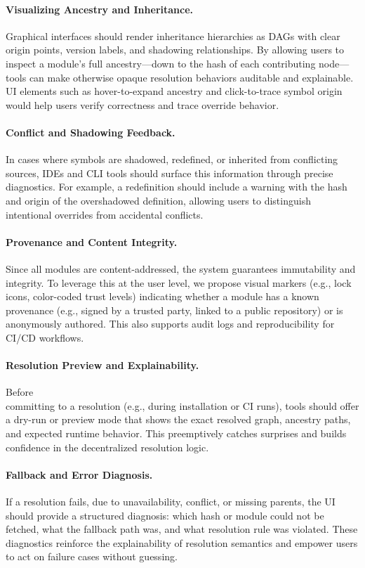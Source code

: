 \documentclass[sigplan,screen]{acmart}
\begin{document}
\paragraph{Visualizing Ancestry and Inheritance.}
Graphical interfaces should render inheritance hierarchies as DAGs with clear origin points, version labels, and shadowing relationships. By allowing users to inspect a module's full ancestry—down to the hash of each contributing node—tools can make otherwise opaque resolution behaviors auditable and explainable. UI elements such as hover-to-expand ancestry and click-to-trace symbol origin would help users verify correctness and trace override behavior.

\paragraph{Conflict and Shadowing Feedback.}
In cases where symbols are shadowed, redefined, or inherited from conflicting sources, IDEs and CLI tools should surface this information through precise diagnostics. For example, a redefinition should include a warning with the hash and origin of the overshadowed definition, allowing users to distinguish intentional overrides from accidental conflicts.

\paragraph{Provenance and Content Integrity.}
Since all modules are content-addressed, the system guarantees immutability and integrity. To leverage this at the user level, we propose visual markers (e.g., lock icons, color-coded trust levels) indicating whether a module has a known provenance (e.g., signed by a trusted party, linked to a public repository) or is anonymously authored. This also supports audit logs and reproducibility for CI/CD workflows.

\paragraph{Resolution Preview and Explainability.}
Before \\committing to a resolution (e.g., during installation or CI runs), tools should offer a dry-run or preview mode that shows the exact resolved graph, ancestry paths, and expected runtime behavior. This preemptively catches surprises and builds confidence in the decentralized resolution logic.

\paragraph{Fallback and Error Diagnosis.}
If a resolution fails, due to unavailability, conflict, or missing parents, the UI should provide a structured diagnosis: which hash or module could not be fetched, what the fallback path was, and what resolution rule was violated. These diagnostics reinforce the explainability of resolution semantics and empower users to act on failure cases without guessing.
\end{document}
